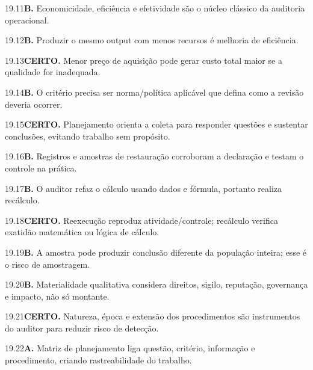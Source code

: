 \begin{solucao}{19.11}\textbf{B.} Economicidade, eficiência e efetividade são o núcleo clássico da auditoria operacional.\end{solucao}
\begin{solucao}{19.12}\textbf{B.} Produzir o mesmo output com menos recursos é melhoria de eficiência.\end{solucao}
\begin{solucao}{19.13}\textbf{CERTO.} Menor preço de aquisição pode gerar custo total maior se a qualidade for inadequada.\end{solucao}
\begin{solucao}{19.14}\textbf{B.} O critério precisa ser norma/política aplicável que defina como a revisão deveria ocorrer.\end{solucao}
\begin{solucao}{19.15}\textbf{CERTO.} Planejamento orienta a coleta para responder questões e sustentar conclusões, evitando trabalho sem propósito.\end{solucao}
\begin{solucao}{19.16}\textbf{B.} Registros e amostras de restauração corroboram a declaração e testam o controle na prática.\end{solucao}
\begin{solucao}{19.17}\textbf{B.} O auditor refaz o cálculo usando dados e fórmula, portanto realiza recálculo.\end{solucao}
\begin{solucao}{19.18}\textbf{CERTO.} Reexecução reproduz atividade/controle; recálculo verifica exatidão matemática ou lógica de cálculo.\end{solucao}
\begin{solucao}{19.19}\textbf{B.} A amostra pode produzir conclusão diferente da população inteira; esse é o risco de amostragem.\end{solucao}
\begin{solucao}{19.20}\textbf{B.} Materialidade qualitativa considera direitos, sigilo, reputação, governança e impacto, não só montante.\end{solucao}
\begin{solucao}{19.21}\textbf{CERTO.} Natureza, época e extensão dos procedimentos são instrumentos do auditor para reduzir risco de detecção.\end{solucao}
\begin{solucao}{19.22}\textbf{A.} Matriz de planejamento liga questão, critério, informação e procedimento, criando rastreabilidade do trabalho.\end{solucao}
